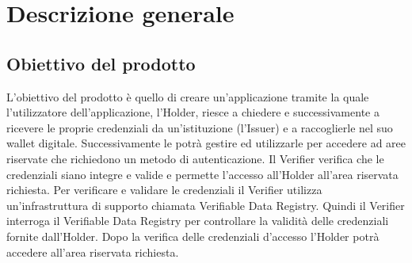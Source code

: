 \section{Descrizione generale}

\subsection{Obiettivo del prodotto}
L’obiettivo del prodotto è quello di creare un’applicazione tramite la quale l’utilizzatore dell’applicazione, l’Holder, riesce a chiedere e successivamente a ricevere le proprie credenziali da un’istituzione (l’Issuer) e a raccoglierle nel suo wallet digitale. Successivamente le potrà gestire ed utilizzarle per accedere ad aree riservate che richiedono un metodo di autenticazione. Il Verifier verifica che le credenziali siano integre e valide e permette l’accesso all’Holder all’area riservata richiesta. Per verificare e validare le credenziali il Verifier utilizza un’infrastruttura di supporto chiamata Verifiable Data Registry. Quindi il Verifier interroga il Verifiable Data Registry per controllare la validità delle credenziali fornite dall’Holder. Dopo la verifica delle credenziali d’accesso l’Holder potrà accedere all’area riservata richiesta.

